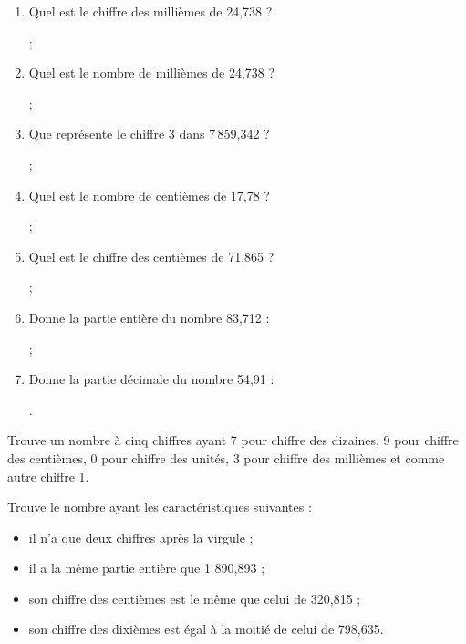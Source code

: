 \begin{exercice}
\begin{enumerate}
 \item Quel est le chiffre des millièmes de 24,738 ?
 
 \dotfill ;
 \item Quel est le nombre de millièmes de 24,738 ?
 
 \dotfill ;
 \item Que représente le chiffre 3 dans 7\,859,342 ?
 
 \dotfill ;
 \item Quel est le nombre de centièmes de 17,78 ?
 
 \dotfill ;
 \item Quel est le chiffre des centièmes de 71,865 ?
 
 \dotfill ;
 \item Donne la partie entière du nombre 83,712 :
 
 \dotfill ;
 \item Donne la partie décimale du nombre 54,91 :
 
 \dotfill.
 \end{enumerate}
\end{exercice}


\begin{exercice}
Trouve un nombre à cinq chiffres ayant 7 pour chiffre des dizaines, 9 pour chiffre des centièmes, 0 pour chiffre des unités, 3 pour chiffre des millièmes et comme autre chiffre 1.
\end{exercice}


\begin{exercice}[Devinette]
Trouve le nombre ayant les caractéristiques suivantes :
\begin{itemize}
 \item il n'a que deux chiffres après la virgule ;
 \item il a la même partie entière que 1 890,893 ;
 \item son chiffre des centièmes est le même que celui de 320,815 ;
 \item son chiffre des dixièmes est égal à la moitié de celui de 798,635.
 \end{itemize}
\end{exercice}


